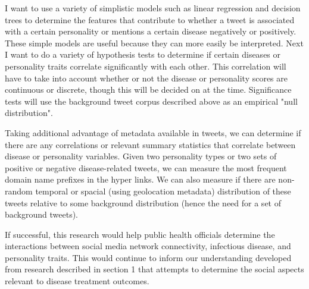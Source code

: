 I want to use a variety of simplistic models such as linear regression and decision trees to determine the features that contribute to whether a tweet is associated with a certain personality or mentions a certain disease negatively or positively. These simple models are useful because they can more easily be interpreted. Next I want to do a variety of hypothesis tests to determine if certain diseases or personality traits correlate significantly with each other. This correlation will have to take into account whether or not the disease or personality scores are continuous or discrete, though this will be decided on at the time. Significance tests will use the background tweet corpus described above as an empirical "null distribution".

Taking additional advantage of metadata available in tweets, we can determine if there are any correlations or relevant summary statistics that correlate between disease or personality variables. Given two personality types or two sets of positive or negative disease-related tweets, we can measure the most frequent domain name prefixes in the hyper links. We can also measure if there are non-random temporal or spacial (using geolocation metadata) distribution of these tweets relative to some background distribution (hence the need for a set of background tweets).

If successful, this research would help public health officials determine the interactions between social media network connectivity, infectious disease, and personality traits. This would continue to inform our understanding developed from research described in section 1 that attempts to determine the social aspects relevant to disease treatment outcomes.

